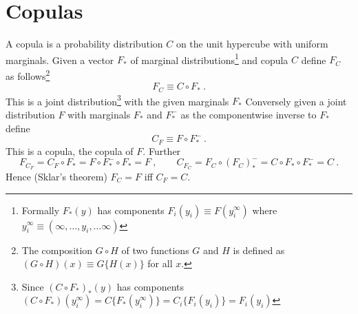 

\section*{Copulas}
A copula is a probability distribution $C$ on the unit hypercube with uniform marginals.  Given a vector $F_*$ of marginal distributions\footnote{Formally $F_*(y)$ has components $F_i(y_i)\equiv F(y_i^\infty)$ where $y_i^\infty\equiv(\infty,\ldots,y_i,\ldots\infty)$} and copula $C$ define $F_C$ as follows\footnote{The composition $G\circ H$ of two functions $G$ and $H$ is defined as $(G\circ H)(x)\equiv G\{H(x)\}$ for all $x$.} \begin{equation}\label{Fx}
    F_C\equiv C\circ F_*\ .
\end{equation}
This is  a joint distribution\footnote{Since $(C\circ F_*)_*(y)$ has components $(C\circ F_*)(y_i^\infty)=C\{F_*(y_i^\infty)\}=C_i\{F_i(y_i)\}=F_i(y_i)$} with the given marginals $F_*$  Conversely given a joint distribution $F$ with marginals $F_*$ and $F_*^-$ as the componentwise inverse to $F_*$ define
\begin{equation}\label{Cu}
    C_F\equiv F\circ F_*^-\ .
\end{equation}
This is a copula, the copula of $F$.   Further
$$
F_{C_F}= C_F\circ F_*= F\circ F_*^-\circ F_*=F\ , \qquad C_{F_C}=F_C\circ (F_C)_*^-=C\circ F_*\circ  F_*^-=C\ .
$$
Hence (Sklar's theorem) $F_C=F$ iff $C_F=C$.  

